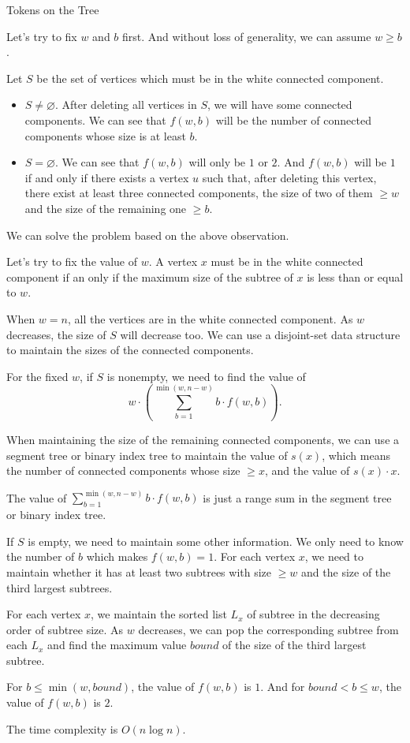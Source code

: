 \begin{tutorial}{Tokens on the Tree}

Let's try to fix $w$ and $b$ first. And without loss of generality, we can assume $w \ge b$.

Let $S$ be the set of vertices which must be in the white connected component.

\begin{itemize}
\item $S \ne \varnothing$. After deleting all vertices in $S$, we will have some connected components. We can see that $f(w,b)$ will be the number of connected components whose size is at least $b$.
\item $S = \varnothing$. We can see that $f(w,b)$ will only be $1$ or $2$. And $f(w,b)$ will be $1$ if and only if there exists a vertex $u$ such that, after deleting this vertex, there exist at least three connected components, the size of two of them $\ge w$ and the size of the remaining one $\ge b$.
\end{itemize}

We can solve the problem based on the above observation.

Let's try to fix the value of $w$. A vertex $x$ must be in the white connected component if an only if the maximum size of the subtree of $x$ is less than or equal to $w$.

When $w=n$, all the vertices are in the white connected component. As $w$ decreases, the size of $S$ will decrease too. We can use a disjoint-set data structure to maintain the sizes of the connected components.

For the fixed $w$, if $S$ is nonempty, we need to find the value of 
$$
w \cdot \left(\sum\limits_{b=1}^{\min(w,n-w)} b \cdot f(w, b)\right)\text{.}
$$

When maintaining the size of the remaining connected components, we can use a segment tree or binary index tree to maintain the value of $s(x)$, which means the number of connected components whose size $\ge x$, and the value of $s(x) \cdot x$.

The value of $\sum\limits_{b=1}^{\min(w,n-w)} b \cdot f(w, b)$ is just a range sum in the segment tree or binary index tree.

If $S$ is empty, we need to maintain some other information. We only need to know the number of $b$ which makes $f(w,b)=1$. For each vertex $x$, we need to maintain whether it has at least two subtrees with size $\ge w$ and the size of the third largest subtrees.

For each vertex $x$, we maintain the sorted list $L_x$ of subtree in the decreasing order of subtree size. As $w$ decreases, we can pop the corresponding subtree from each $L_x$ and find the maximum value $\mathit{bound}$ of the size of the third largest subtree.

For $b \le \min(w, \mathit{bound})$, the value of $f(w,b)$ is $1$. And for $\mathit{bound} < b \le w$, the value of $f(w,b)$ is $2$.

The time complexity is $O(n \log n)$.

\end{tutorial}
